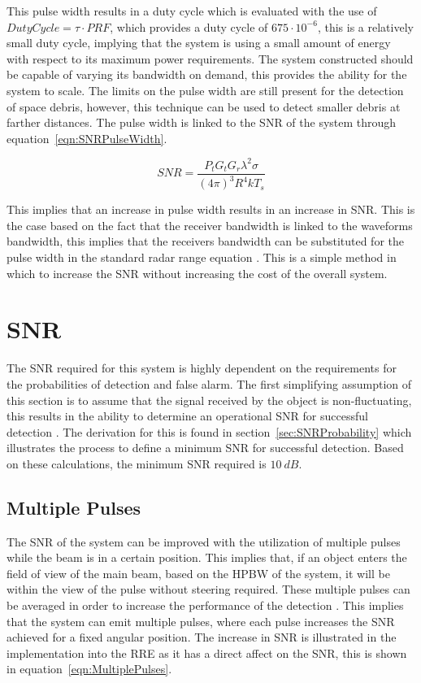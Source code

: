 \documentclass[11pt]{witseiepaper}
\begin{document}
\begin{bibunit}[witseie]
This pulse width results in a duty cycle which is evaluated with the use of $Duty Cycle = \tau \cdot PRF$, which provides a duty cycle of $675 \cdot 10^{-6}$, this is a relatively small duty cycle, implying that the system is using a small amount of energy with respect to its maximum power requirements.
The system constructed should be capable of varying its bandwidth on demand, this provides the ability for the system to scale. The limits on the pulse width are still present for the detection of space debris, however, this technique can be used to detect smaller debris at farther distances.
The pulse width is linked to the SNR of the system through equation~\ref{eqn:SNRPulseWidth}.

\begin{equation} \label{eqn:SNRPulseWidth}
SNR = \frac{P_{t} G_t G_r {\lambda^2} \sigma}{(4 \pi )^3 R^4 k T_s}
\end{equation}

This implies that an increase in pulse width results in an increase in SNR. This is the case based on the fact that the receiver bandwidth is linked to the waveforms bandwidth, this implies that the receivers bandwidth can be substituted for the pulse width in the standard radar range equation \cite[p.~776]{radarHandbook}.
This is a simple method in which to increase the SNR without increasing the cost of the overall system.

\section{SNR} \label{sec:SNR}
The SNR required for this system is highly dependent on the requirements for the probabilities of detection and false alarm. The first simplifying assumption of this section is to assume that the signal received by the object is non-fluctuating, this results in the ability to determine an operational SNR for successful detection \cite[p.~102-103]{radarHandbook}.
The derivation for this is found in section~\ref{sec:SNRProbability} which illustrates the process to define a minimum SNR for successful detection. Based on these calculations, the minimum SNR required is $10~dB$.

\subsection{Multiple Pulses} \label{sec:MultiplePulses}
The SNR of the system can be improved with the utilization of multiple pulses while the beam is in a certain position. This implies that, if an object enters the field of view of the main beam, based on the HPBW of the system, it will be within the view of the pulse without steering required.
These multiple pulses can be averaged in order to increase the performance of the detection \cite[p.~66]{radarHandbook}. This implies that the system can emit multiple pulses, where each pulse increases the SNR achieved for a fixed angular position.
The increase in SNR is illustrated in the implementation into the RRE as it has a direct affect on the SNR, this is shown in equation~\ref{eqn:MultiplePulses}.


\end{bibunit}
\end{document}
